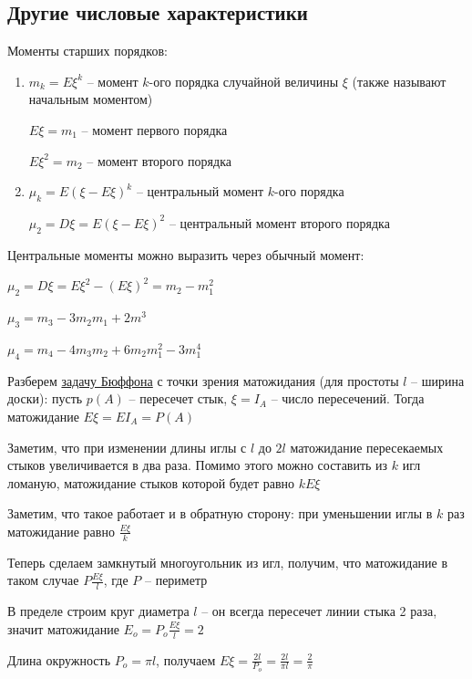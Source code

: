 \documentclass[12pt]{article}
\begin{document}
    \subsection{Другие числовые характеристики}

    Моменты старших порядков:

    \begin{enumerate}
        \item $m_k = E\xi^k$ -- момент $k$-ого порядка случайной величины $\xi$ (также называют начальным моментом)

        $E\xi = m_1$ -- момент первого порядка

        $E\xi^2 = m_2$ -- момент второго порядка

        \item $\mu_k = E(\xi - E\xi)^k$ -- центральный момент $k$-ого порядка

        $\mu_2 = D\xi = E(\xi - E\xi)^2$ -- центральный момент второго порядка
    \end{enumerate}

    \Nota Центральные моменты можно выразить через обычный момент:

    $\mu_2 = D\xi = E\xi^2 - (E\xi)^2 = m_2 - m_1^2$

    $\mu_3 = m_3 - 3m_2 m_1 + 2m^3$

    $\mu_4 = m_4 - 4m_3 m_2 + 6m_2 m_1^2 - 3m_1^4$

    \Ex Разберем \hyperlink{buffonsproblem}{задачу Бюффона} с точки зрения матожидания (для простоты $l$ -- ширина доски): пусть $p(A)$ -- пересечет стык,
    $\xi = I_A$ -- число пересечений. Тогда матожидание $E\xi = E I_A = P(A)$

    Заметим, что при изменении длины иглы с $l$ до $2l$ матожидание пересекаемых стыков увеличивается
    в два раза. Помимо этого можно составить из $k$ игл ломаную, матожидание стыков которой будет равно $kE\xi$

    Заметим, что такое работает и в обратную сторону: при уменьшении иглы в $k$ раз матожидание равно $\frac{E\xi}{k}$

    Теперь сделаем замкнутый многоугольник из игл, получим, что матожидание в таком случае $P\frac{E\xi}{l}$, где $P$ -- периметр

    В пределе строим круг диаметра $l$ -- он всегда пересечет линии стыка 2 раза, значит матожидание $E_o = P_o\frac{E\xi}{l} = 2$

    Длина окружность $P_o = \pi l$, получаем $E\xi = \frac{2l}{P_o} = \frac{2l}{\pi l} = \frac{2}{\pi}$
\end{document}
